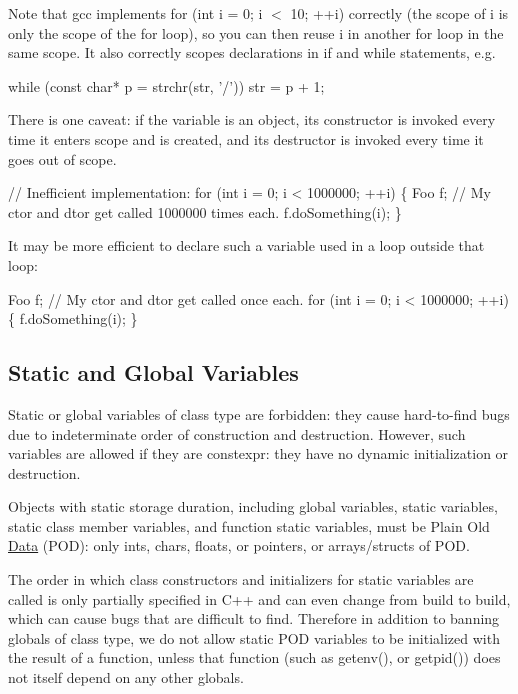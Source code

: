 Note that gcc implements {\ttfamily for (int i = 0; i $<$ 10; ++i)} correctly (the scope of i is only the scope of the for loop), so you can then reuse i in another for loop in the same scope. It also correctly scopes declarations in if and while statements, e.\+g.


\begin{DoxyCode}
\textcolor{keywordflow}{while} (\textcolor{keyword}{const} \textcolor{keywordtype}{char}* p = strchr(str, \textcolor{charliteral}{'/'})) str = p + 1;
\end{DoxyCode}


There is one caveat\+: if the variable is an object, its constructor is invoked every time it enters scope and is created, and its destructor is invoked every time it goes out of scope.


\begin{DoxyCode}
\textcolor{comment}{// Inefficient implementation:}
\textcolor{keywordflow}{for} (\textcolor{keywordtype}{int} i = 0; i < 1000000; ++i) \{
    Foo f;  \textcolor{comment}{// My ctor and dtor get called 1000000 times each.}
    f.doSomething(i);
\}

It may be more efficient to declare such a variable used in a loop outside that loop:

Foo f;  \textcolor{comment}{// My ctor and dtor get called once each.}
\textcolor{keywordflow}{for} (\textcolor{keywordtype}{int} i = 0; i < 1000000; ++i) \{
    f.doSomething(i);
\}
\end{DoxyCode}


\subsection*{Static and Global Variables}

Static or global variables of class type are forbidden\+: they cause hard-\/to-\/find bugs due to indeterminate order of construction and destruction. However, such variables are allowed if they are {\ttfamily constexpr}\+: they have no dynamic initialization or destruction.

Objects with static storage duration, including global variables, static variables, static class member variables, and function static variables, must be Plain Old \hyperlink{classData}{Data} (P\+OD)\+: only ints, chars, floats, or pointers, or arrays/structs of P\+OD.

The order in which class constructors and initializers for static variables are called is only partially specified in C++ and can even change from build to build, which can cause bugs that are difficult to find. Therefore in addition to banning globals of class type, we do not allow static P\+OD variables to be initialized with the result of a function, unless that function (such as getenv(), or getpid()) does not itself depend on any other globals.

